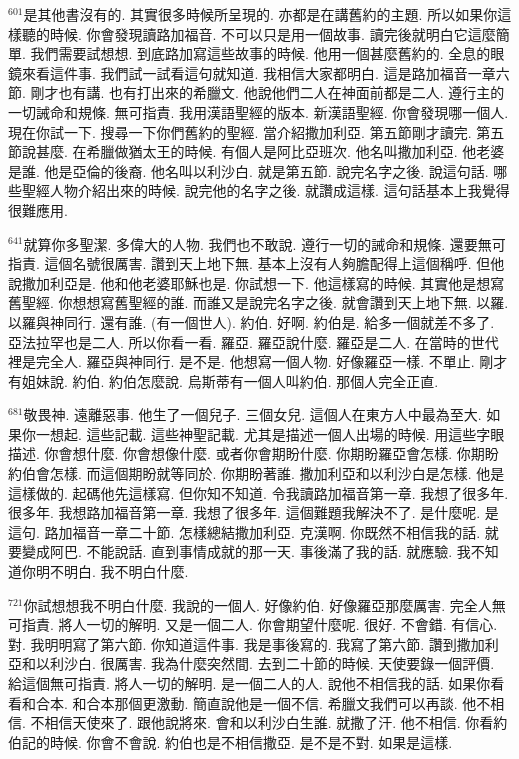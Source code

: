 \documentclass{book}
\begin{document}
$^{601}$是其他書沒有的.
其實很多時候所呈現的.
亦都是在講舊約的主題.
所以如果你這樣聽的時候.
你會發現讀路加福音.
不可以只是用一個故事.
讀完後就明白它這麼簡單.
我們需要試想想.
到底路加寫這些故事的時候.
他用一個甚麼舊約的.
全息的眼鏡來看這件事.
我們試一試看這句就知道.
我相信大家都明白.
這是路加福音一章六節.
剛才也有講.
也有打出來的希臘文.
他說他們二人在神面前都是二人.
遵行主的一切誡命和規條.
無可指責.
我用漢語聖經的版本.
新漢語聖經.
你會發現哪一個人.
現在你試一下.
搜尋一下你們舊約的聖經.
當介紹撒加利亞.
第五節剛才讀完.
第五節說甚麼.
在希臘做猶太王的時候.
有個人是阿比亞班次.
他名叫撒加利亞.
他老婆是誰.
他是亞倫的後裔.
他名叫以利沙白.
就是第五節.
說完名字之後.
說這句話.
哪些聖經人物介紹出來的時候.
說完他的名字之後.
就讚成這樣.
這句話基本上我覺得很難應用.

$^{641}$就算你多聖潔.
多偉大的人物.
我們也不敢說.
遵行一切的誡命和規條.
還要無可指責.
這個名號很厲害.
讚到天上地下無.
基本上沒有人夠膽配得上這個稱呼.
但他說撒加利亞是.
他和他老婆耶穌也是.
你試想一下.
他這樣寫的時候.
其實他是想寫舊聖經.
你想想寫舊聖經的誰.
而誰又是說完名字之後.
就會讚到天上地下無.
以羅.
以羅與神同行.
還有誰.
(有一個世人).
約伯.
好啊.
約伯是.
給多一個就差不多了.
亞法拉罕也是二人.
所以你看一看.
羅亞.
羅亞說什麼.
羅亞是二人.
在當時的世代裡是完全人.
羅亞與神同行.
是不是.
他想寫一個人物.
好像羅亞一樣.
不單止.
剛才有姐妹說.
約伯.
約伯怎麼說.
烏斯蒂有一個人叫約伯.
那個人完全正直.

$^{681}$敬畏神.
遠離惡事.
他生了一個兒子.
三個女兒.
這個人在東方人中最為至大.
如果你一想起.
這些記載.
這些神聖記載.
尤其是描述一個人出場的時候.
用這些字眼描述.
你會想什麼.
你會想像什麼.
或者你會期盼什麼.
你期盼羅亞會怎樣.
你期盼約伯會怎樣.
而這個期盼就等同於.
你期盼著誰.
撒加利亞和以利沙白是怎樣.
他是這樣做的.
起碼他先這樣寫.
但你知不知道.
令我讀路加福音第一章.
我想了很多年.
很多年.
我想路加福音第一章.
我想了很多年.
這個難題我解決不了.
是什麼呢.
是這句.
路加福音一章二十節.
怎樣總結撒加利亞.
克漢啊.
你既然不相信我的話.
就要變成阿巴.
不能說話.
直到事情成就的那一天.
事後滿了我的話.
就應驗.
我不知道你明不明白.
我不明白什麼.

$^{721}$你試想想我不明白什麼.
我說的一個人.
好像約伯.
好像羅亞那麼厲害.
完全人無可指責.
將人一切的解明.
又是一個二人.
你會期望什麼呢.
很好.
不會錯.
有信心.
對.
我明明寫了第六節.
你知道這件事.
我是事後寫的.
我寫了第六節.
讚到撒加利亞和以利沙白.
很厲害.
我為什麼突然間.
去到二十節的時候.
天使要錄一個評價.
給這個無可指責.
將人一切的解明.
是一個二人的人.
說他不相信我的話.
如果你看看和合本.
和合本那個更激動.
簡直說他是一個不信.
希臘文我們可以再談.
他不相信.
不相信天使來了.
跟他說將來.
會和以利沙白生誰.
就撒了汗.
他不相信.
你看約伯記的時候.
你會不會說.
約伯也是不相信撒亞.
是不是不對.
如果是這樣.
\end{document}
